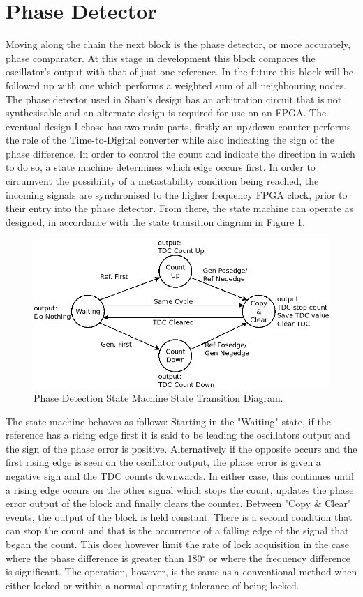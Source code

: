 \documentclass[11pt,english,british]{report}
\begin{document}
\section{Phase Detector}
Moving along the chain the next block is the phase detector, or more accurately, phase comparator. At this stage in development this block compares the oscillator's output with that of just one reference. In the future this block will be followed up with one which performs a weighted sum of all neighbouring nodes. The phase detector used in Shan's design has an arbitration circuit that is not synthesisable and an alternate design is required for use on an FPGA. The eventual design I chose has two main parts, firstly an up/down counter performs the role of the Time-to-Digital converter while also indicating the sign of the phase difference. In order to control the count and indicate the direction in which to do so, a state machine determines which edge occurs first. In order to circumvent the possibility of a metastability condition being reached, the incoming signals are synchronised to the higher frequency FPGA clock, prior to their entry into the phase detector. From there, the state machine can operate as designed, in accordance with the state transition diagram in Figure \ref{fig:my_state_machine}.
\begin{figure}[h]
	\centering
	\includegraphics[scale=0.35]{../state_trans_diagram}
	\caption{Phase Detection State Machine State Transition Diagram.}
	\label{fig:my_state_machine}
\end{figure}

The state machine behaves as follows: Starting in the "Waiting" state, if the reference has a rising edge first it is said to be leading the oscillators output and the sign of the phase error is positive. Alternatively if the opposite occurs and the first rising edge is seen on the oscillator output, the phase error is given a negative sign and the TDC counts downwards. In either case, this continues until a rising edge occurs on the other signal which stops the count, updates the phase error output of the block and finally clears the counter. Between "Copy \& Clear" events, the output of the block is held constant. There is a second condition that can stop the count and that is the occurrence of a falling edge of the signal that began the count. This does however limit the rate of lock acquisition in the case where the phase difference is greater than 180$^\circ$ or where the frequency difference is significant. The operation, however, is the same as a conventional method when either locked or within a normal operating tolerance of being locked.
\end{document}
